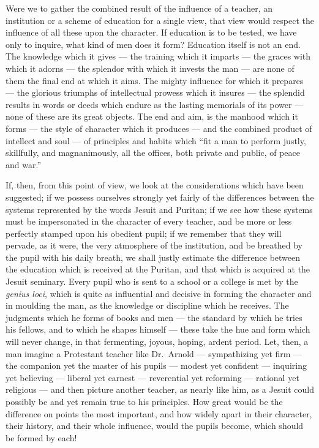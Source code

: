 \documentclass[]{book}
\begin{document}
Were we to gather the combined result of the influence of a teacher, an institution or a scheme of education for a single view, that view would respect the influence of all these upon the character. If education is to be tested, we have only to inquire, what kind of men does it form? Education itself is not an end. The knowledge which it gives --- the training which it imparts --- the graces with which it adorns --- the splendor with which it invests the man --- are none of them the final end at which it aims. The mighty influence for which it prepares --- the glorious triumphs of intellectual prowess which it insures --- the splendid results in words or deeds which endure as the lasting memorials of its power --- none of these are its great objects. The end and aim, is the manhood which it forms --- the style of character which it produces --- and the combined product of intellect and soul --- of principles and habits which ``fit a man to perform justly, skillfully, and magnanimously, all the offices, both private and public, of peace and war.''

If, then, from this point of view, we look at the considerations which have been suggested; if we possess ourselves strongly yet fairly of the differences between the systems represented by the words Jesuit and Puritan; if we see how these systems must be impersonated in the character of every teacher, and be more or less perfectly stamped upon his obedient pupil; if we remember that they will pervade, as it were, the very atmosphere of the institution, and be breathed by the pupil with his daily breath, we shall justly estimate the difference between the education which is received at the Puritan, and that which is acquired at the Jesuit seminary. Every pupil who is sent to a school or a college is met by the \emph{genius loci}, which is quite as influential and decisive in forming the character and in moulding the man, as the knowledge or discipline which he receives. The judgments which he forms of books and men --- the standard by which he tries his fellows, and to which he shapes himself --- these take the hue and form which will never change, in that fermenting, joyous, hoping, ardent period. Let, then, a man imagine a Protestant teacher like Dr.~Arnold --- sympathizing yet firm --- the companion yet the master of his pupils --- modest yet confident --- inquiring yet believing --- liberal yet earnest --- reverential yet reforming --- rational yet religious --- and then picture another teacher, as nearly like him, as a Jesuit could possibly be and yet remain true to his principles. How great would be the difference on points the most important, and how widely apart in their character, their history, and their whole influence, would the pupils become, which should be formed by each!
\end{document}
